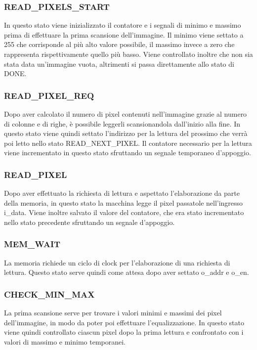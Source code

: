 \documentclass{article}
\begin{document}
\subsubsection{READ\_PIXELS\_START}
In questo stato viene inizializzato il contatore  e i segnali di minimo e massimo prima di effettuare la prima scansione dell'immagine. Il minimo viene settato a 255 che corrisponde al più alto valore possibile, il massimo invece a zero che rappresenta rispettivamente quello più basso. Viene controllato inoltre che non sia stata data un'immagine vuota, altrimenti si passa direttamente allo stato di DONE.

\subsubsection{READ\_PIXEL\_REQ}
Dopo aver calcolato il numero di pixel contenuti nell'immagine grazie al numero di colonne e di righe, è possibile leggerli scansionandola dall'inizio alla fine. In questo stato viene quindi settato l'indirizzo per la lettura del prossimo che verrà poi letto nello stato READ\_NEXT\_PIXEL. Il contatore necessario per la lettura viene incrementato in questo stato sfruttando un segnale temporaneo d'appoggio.

\subsubsection{READ\_PIXEL}
Dopo aver effettuato la richiesta di lettura e aspettato l'elaborazione da parte della memoria, in questo stato la macchina legge il pixel passatole nell'ingresso i\_data. Viene inoltre salvato il valore del contatore, che era stato incrementato nello stato precedente sfruttando un segnale d'appoggio.

\subsubsection{MEM\_WAIT}
La memoria richiede un ciclo di clock per l'elaborazione di una richiesta di lettura. Questo stato serve quindi come attesa dopo aver settato o\_addr e o\_en.

\subsubsection{CHECK\_MIN\_MAX}
La prima scansione serve per trovare i valori minimi e massimi dei pixel dell'immagine, in modo da poter poi effettuare l'equalizzazione. In questo stato viene quindi controllato ciascun pixel dopo la prima lettura e confrontato con i valori di massimo e minimo temporanei.
\end{document}
